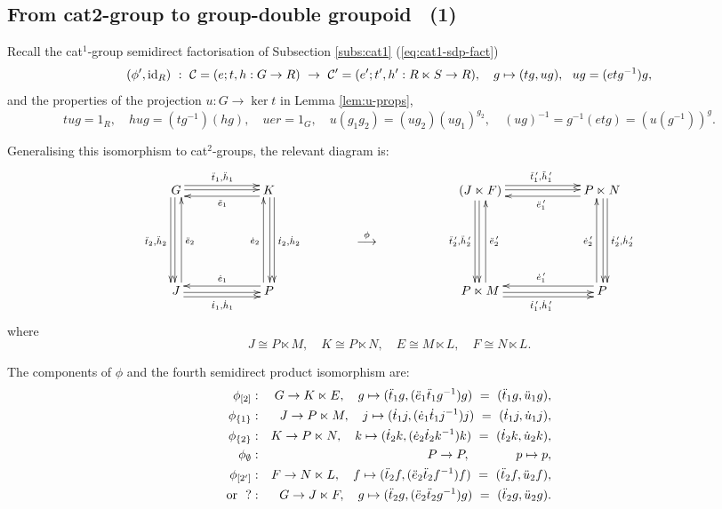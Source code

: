 \newpage
\subsection{From cat2-group to group-double groupoid ~(1)}

Recall the cat$^1$-group semidirect factorisation of 
Subsection \ref{subs:cat1} (\ref{eq:cat1-sdp-fact})
$$
(\phi',\mathrm{id}_R) ~:~ \mathcal{C} = (e;t,h : G \to R) 
                ~\to~ \mathcal{C}' = (e';t',h' : R \ltimes S \to R),
                \quad g \mapsto (tg,ug),~~ ug = (etg^{-1})g, 
$$
and the properties of the projection $u : G \to \ker t$ 
in Lemma \ref{lem:u-props},
$$
tug = 1_R, \quad
hug = (tg^{-1})(hg), \quad 
uer = 1_G, \quad
u(g_1g_2) = (ug_2)(ug_1)^{g_2}, \quad
(ug)^{-1} = g^{-1}(etg) = (u(g^{-1}))^g.
$$

\noindent
Generalising this isomorphism to cat$^2$-groups, the relevant diagram is: 
$$
\xymatrix @C=5.0pc @R=2.0pc{
G \ar[r]<1.0ex>^{\ddtto,\ddhho} \ar[r]<0.2ex> 
  \ar[dd]<-1.0ex>_{\ddttt,\ddhht} \ar[dd]<-0.2ex> 
  & K \ar[dd]<1.0ex>^{\dttt,\dhht} \ar[dd]<0.2ex> 
      \ar[l]<1.0ex>^{\ddeeo}
    & & (J \ltimes F) 
        \ar[r]<1.0ex>^{{\ddtto}^{\,\prime},{\ddhho}^{\,\prime}} 
        \ar[r]<0.2ex>
        \ar[dd]<-1.0ex>_{{\ddttt}^{\,\prime},{\ddhht}^{\,\prime}} 
        \ar[dd]<-0.2ex>
        & P \ltimes N  \ar[l]<1.0ex>^{{\ddeeo}^{\,\prime}} 
                       \ar[dd]<1.0ex>^{{\dttt}^{\,\prime},{\dhht}^{\,\prime}} 
                       \ar[dd]<0.2ex>\\
  & & \stackrel{\phi}{\longrightarrow} 
      & & \\
J \ar[r]<-1.0ex>_{\dtto,\dhho} \ar[r]<-0.2ex>
  \ar[uu]<-1.0ex>_{\ddeet} 
  & P \ar[l]<-1.0ex>_{\deeo} \ar[uu]<1.0ex>^{\deet} 
    & & P \ltimes M \ar[r]<-1.0ex>_{{\dtto}^{\,\prime},{\dhho}^{\,\prime}} 
                    \ar[r]<-0.2ex>
                    \ar[uu]<-1.0ex>_{{\ddeet}^{\,\prime}}
        & P \ar[l]<-1.0ex>_{{\deeo}^{\,\prime}}  
            \ar[uu]<1.0ex>^{{\deet}^{\,\prime}}
}
$$
where
$$
J \cong P \ltimes M, \quad
K \cong P \ltimes N, \quad
E \cong M \ltimes L, \quad
F \cong N \ltimes L.
$$

\noindent
The components of $\phi$ and the fourth semidirect product isomorphism are: 
\begin{eqnarray*}
\phi_{[2]} &:& G \to K \ltimes E, \quad
  g \mapsto (\ddtto g, (\ddeeo\ddtto g^{-1})g) ~=~ (\ddtto g, \dduuo g),\\
\phi_{\{1\}} &:& J \to P \ltimes M, \quad
  j \mapsto (\dtto j, (\deeo\dtto j^{-1})j) ~=~ (\dtto j, \duuo j),\\
\phi_{\{2\}} &:& K \to P \ltimes N, \quad
  k \mapsto (\dttt k, (\deet\dttt k^{-1})k) ~=~ (\dttt k, \duut k),\\
\phi_{\emptyset} &:& P \to P, \hspace{13mm} p \mapsto p,\\
\phi_{[2']} &:& F \to N \ltimes L, \quad
  f \mapsto (\ddttt f, (\ddeet\ddttt f^{-1})f) ~=~ (\ddttt f, \dduut f),\\
\mbox{or}~~ ? &:& G \to J \ltimes F, \quad
  g \mapsto (\ddttt g, (\ddeet\ddttt g^{-1})g) ~=~ (\ddttt g, \dduut g).
\end{eqnarray*}

